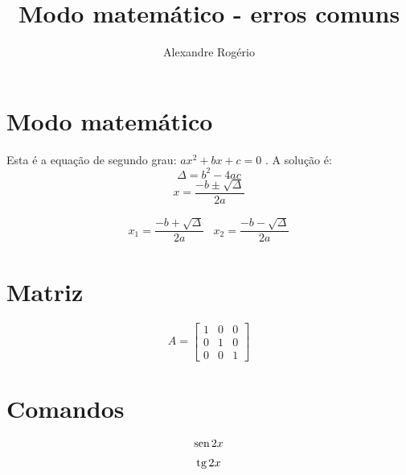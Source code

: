 \documentclass{article}
\renewcommand{\sin}{\mathrm{sen\hspace{0.5mm}}}
\renewcommand{\tan}{\mathrm{tg\hspace{0.5mm}}}
\begin{document}
	
	\title{\textbf{{\Huge Modo matemático - erros comuns}}}
	\author{Alexandre Rogério}
	\maketitle
	\thispagestyle{empty} %
	\newpage
	
	\setcounter{page}{1}
	\tableofcontents
	\newpage
	
	\listoffigures
	\newpage
	
	\listoftables
	\newpage
	
	\setcounter{page}{1}
	
	\section{Modo matemático}
	Esta é a equação de segundo grau: $ ax^2 + bx + c = 0 $ . A solução é:
	\begin{equation*}
		\Delta = b^2 - 4ac
	\end{equation*}
	\begin{equation*}
		x = \frac{-b \pm \sqrt{\Delta}}{2a}
	\end{equation*}

	\begin{equation*}
		\begin{array}{cc}
			x_1 = \dfrac{-b + \sqrt{\Delta}}{2a}	&
			x_2 = \dfrac{-b - \sqrt{\Delta}}{2a}
		\end{array}
	\end{equation*}

	\section{Matriz}
	\begin{equation*}
		A = \begin{bmatrix}
			1 & 0 & 0 \\
			0 & 1 & 0 \\
			0 & 0 & 1
		\end{bmatrix}
	\end{equation*}

	\section{Comandos}
	\begin{equation*}
		\sin{2x}
	\end{equation*}

	\begin{equation*}
		\tan{2x}
	\end{equation*}
\end{document}
